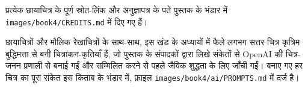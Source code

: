 प्रत्येक छायाचित्र के पूर्ण स्रोत-लिंक और अनुज्ञापत्र के पते पुस्तक के
भंडार में \texttt{images/\allowbreak book4/\allowbreak CREDITS.md} में दिए गए हैं।

\bigskip
छायाचित्रों और मौलिक रेखाचित्रों के साथ-साथ, इस खंड के अध्यायों में फैले
लगभग सत्तर चित्र कृत्रिम बुद्धिमत्ता से बनी चित्रांकन-कृतियाँ हैं, जो
पुस्तक के संपादकों द्वारा लिखे संकेतों से OpenAI की चित्र-जनन प्रणाली से
बनाई गईं और सम्मिलित करने से पहले जैविक शुद्धता के लिए जाँची गईं।
बनाए गए हर चित्र का पूरा संकेत इस किताब के भंडार में, फ़ाइल
\texttt{images/\allowbreak book4/\allowbreak ai/\allowbreak PROMPTS.md} में दर्ज है।
\par\endgroup
\clearpage
